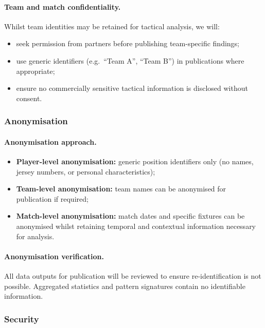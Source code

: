 \paragraph{Team and match confidentiality.}
Whilst team identities may be retained for tactical analysis, we will:
\begin{itemize}
  \item seek permission from partners before publishing team-specific findings;
  \item use generic identifiers (e.g.\ ``Team A'', ``Team B'') in publications where appropriate;
  \item ensure no commercially sensitive tactical information is disclosed without consent.
\end{itemize}

\subsubsection{Anonymisation}

\paragraph{Anonymisation approach.}
\begin{itemize}
  \item \textbf{Player-level anonymisation:} generic position identifiers only (no names, jersey numbers, or personal characteristics);
  \item \textbf{Team-level anonymisation:} team names can be anonymised for publication if required;
  \item \textbf{Match-level anonymisation:} match dates and specific fixtures can be anonymised whilst retaining temporal and contextual information necessary for analysis.
\end{itemize}

\paragraph{Anonymisation verification.}
All data outputs for publication will be reviewed to ensure re-identification is not possible. Aggregated statistics and pattern signatures contain no identifiable information.

\subsubsection{Security}

